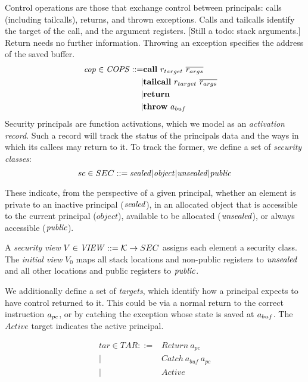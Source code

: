 \documentclass[10pt,conference]{ieeetran}%
\theoremstyle{definition}
\begin{document}
Control operations are those that exchange
control between principals: calls (including tailcalls), returns, and thrown
exceptions. Calls and tailcalls identify the target of the call, and the argument registers.
[Still a todo: stack arguments.] Return needs no further information. Throwing
an exception specifies the address of the saved buffer.
%
\begin{align*}
  \mathit{cop} \in \mathit{COPS} ::= & \mathbf{call} ~ r_{target} ~ \overline{r_{args}} & \\
  | & \mathbf{tailcall} ~ r_{target} ~ \overline{r_{args}} & \\
  | & \mathbf{return} & \\
  | & \mathbf{throw} ~ a_{buf} \\
\end{align*}
%
Security principals are function activations, which we model as an {\em activation record}.
Such a record will track the status of the principals data and the ways in which its callees
may return to it. To track the former, we define a set of {\it security classes}:
\[sc \in SEC ::= \mathit{sealed} | \mathit{object} | \mathit{unsealed} | \mathit{public}\]

These indicate, from the perspective of a given principal, whether an element is
private to an inactive principal (\(\mathit{sealed}\)),
in an allocated object that is accessible to the current principal (\(\mathit{object}\)),
available to be allocated (\(\mathit{unsealed}\)), or
always accessible (\(\mathit{public}\)).

A {\it security view} \(V \in \mathit{VIEW} ::= {\mathcal K} \rightarrow SEC\)
assigns each element a security class.
The {\it initial view} \(V_0\) maps all stack locations and non-public registers
to \(\mathit{unsealed}\) and all other locations and public registers to \(\mathit{public}\).

We additionally define a set of {\it targets}, which identify how a
principal expects to have control returned to it. This could be via a normal
return to the correct instruction \(a_{pc}\), or by catching the exception
whose state is saved at \(a_{buf}\). The \(\mathit{Active}\) target indicates
the active principal.

\[\begin{split}
tar \in TAR ::= & \mathit{Return} ~ a_{pc} \\
| & \mathit{Catch} ~ a_{buf} ~ a_{pc} \\
| & \mathit{Active} \\
\end{split}\]
\end{document}
